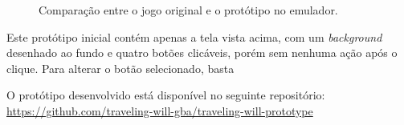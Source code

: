 \begin{figure}%
    \centering
    \qquad
    \caption{Comparação entre o jogo original e o protótipo no emulador.}%
    \label{fig:example}%
\end{figure}

Este protótipo inicial contém apenas a tela vista acima, com um \textit{background} desenhado ao fundo e quatro botões clicáveis, porém sem nenhuma ação após o clique. Para alterar o botão selecionado, basta

O protótipo desenvolvido está disponível no seguinte repositório: \url{https://github.com/traveling-will-gba/traveling-will-prototype}

